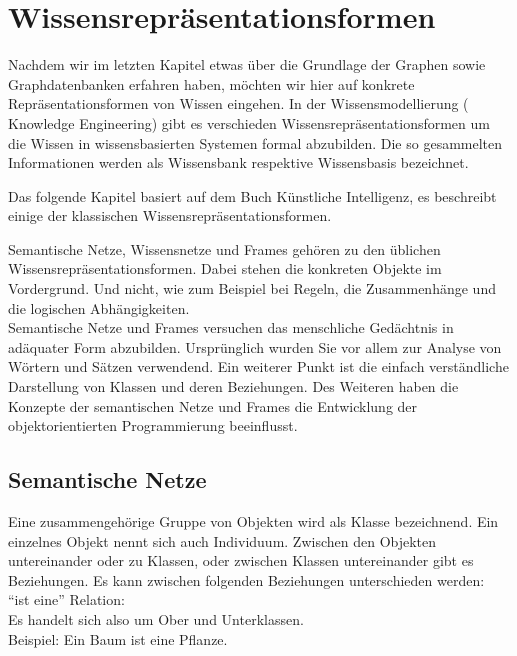 \chapter{Wissensrepräsentationsformen}
\label{chap:wissensrepFormen}

Nachdem wir im letzten Kapitel etwas über die Grundlage der Graphen sowie Graphdatenbanken erfahren haben, möchten wir hier auf konkrete Repräsentationsformen von Wissen eingehen.
In der Wissensmodellierung ( Knowledge Engineering) gibt es verschieden Wissensrepräsentationsformen um die Wissen in wissensbasierten Systemen formal abzubilden. Die so gesammelten Informationen werden als Wissensbank respektive Wissensbasis bezeichnet.~\cite{wikiWissensrep}

Das folgende Kapitel basiert auf dem Buch Künstliche Intelligenz\cite{laemmel}, es beschreibt einige der klassischen Wissensrepräsentationsformen.

Semantische Netze, Wissensnetze und Frames gehören zu den üblichen Wissensrepräsentationsformen. Dabei stehen die konkreten Objekte im Vordergrund. Und nicht, wie zum Beispiel bei Regeln, die Zusammenhänge und die logischen Abhängigkeiten.\\

Semantische Netze und Frames versuchen das menschliche Gedächtnis in adäquater Form abzubilden. Ursprünglich wurden Sie vor allem zur Analyse von Wörtern und Sätzen verwendend. Ein weiterer Punkt ist die einfach verständliche Darstellung von Klassen und deren Beziehungen. Des Weiteren haben die Konzepte der semantischen Netze und Frames die Entwicklung der objektorientierten Programmierung beeinflusst.

\section{Semantische Netze}
\label{sec:wissensrepFormen_semantischeNetze}

Eine zusammengehörige Gruppe von Objekten wird als Klasse bezeichnend. Ein einzelnes Objekt nennt sich auch Individuum. Zwischen den Objekten untereinander oder zu Klassen, oder zwischen Klassen untereinander gibt es Beziehungen. Es kann zwischen folgenden Beziehungen unterschieden werden:\\


"`ist eine"' Relation: \\
\noindent\hspace*{15mm} Es handelt sich also um Ober und Unterklassen.\\ 
\noindent\hspace*{15mm} Beispiel: Ein Baum ist eine Pflanze.\\


